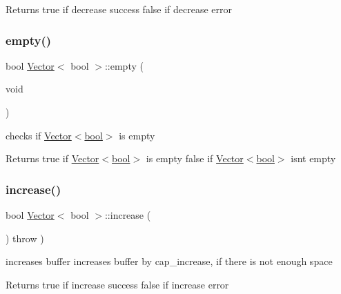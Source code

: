 \begin{DoxyReturn}{Returns}
true if decrease success false if decrease error 
\end{DoxyReturn}
\mbox{\label{classVector_3_01bool_01_4_a830fa9ddb2e3b9b000ecd6a15f51f6c2}} 
\subsubsection{\texorpdfstring{empty()}{empty()}}
{\footnotesize\ttfamily bool \hyperlink{classVector}{Vector}$<$ bool $>$\+::empty (\begin{DoxyParamCaption}\item[{void}]{ }\end{DoxyParamCaption})}



checks if \hyperlink{classVector_3_01bool_01_4}{Vector$<$bool$>$} is empty 

\begin{DoxyReturn}{Returns}
true if \hyperlink{classVector_3_01bool_01_4}{Vector$<$bool$>$} is empty false if \hyperlink{classVector_3_01bool_01_4}{Vector$<$bool$>$} isn\textquotesingle{}t empty 
\end{DoxyReturn}
\mbox{\label{classVector_3_01bool_01_4_afebfb559bb1f4b771fe43b5d2a94a3d7}} 
\subsubsection{\texorpdfstring{increase()}{increase()}}
{\footnotesize\ttfamily bool \hyperlink{classVector}{Vector}$<$ bool $>$\+::increase (\begin{DoxyParamCaption}{ }\end{DoxyParamCaption}) throw  ) \hspace{0.3cm}{\ttfamily [private]}}



increases buffer  increases buffer by cap\+\_\+increase, if there is not enough space 

\begin{DoxyReturn}{Returns}
true if increase success false if increase error 
\end{DoxyReturn}
\mbox{\label{classVector_3_01bool_01_4_ad5616dff05cceca72ddb94463c3be844}} 

